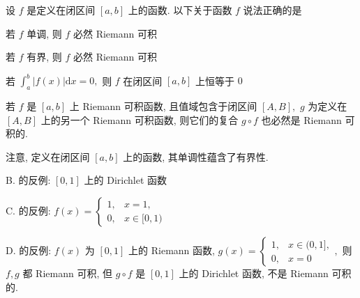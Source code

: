 
\begin{question}
设 $f$ 是定义在闭区间 $[a, b]$ 上的函数. 以下关于函数 $f$ 说法正确的是 \paren[A]

\begin{choices}
\item 若 $f$ 单调, 则 $f$ 必然 Riemann 可积
\item 若 $f$ 有界, 则 $f$ 必然 Riemann 可积
\item 若 $\int_a^b \lvert f(x) \rvert \mathrm{d} x = 0,$ 则 $f$ 在闭区间 $[a, b]$ 上恒等于 $0$
\item 若 $f$ 是 $[a, b]$ 上 Riemann 可积函数, 且值域包含于闭区间 $[A, B],$ $g$ 为定义在 $[A, B]$ 上的另一个 Riemann 可积函数, 则它们的复合 $g\circ f$ 也必然是 Riemann 可积的.
\end{choices}
\end{question}

\begin{solution}
注意, 定义在闭区间 $[a, b]$ 上的函数, 其单调性蕴含了有界性.

B. 的反例: $[0, 1]$ 上的 Dirichlet 函数

C. 的反例: $f(x) = \begin{cases}
1, & x = 1, \\
0, & x \in [0, 1)
\end{cases}$

D. 的反例: $f(x)$ 为 $[0, 1]$ 上的 Riemann 函数, $g(x) = \begin{cases}
1, & x \in (0, 1], \\
0, & x = 0
\end{cases},$ 则 $f, g$ 都 Riemann 可积, 但 $g\circ f$ 是 $[0, 1]$ 上的 Dirichlet 函数, 不是 Riemann 可积的.
\end{solution}

